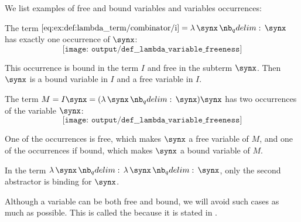 \begin{example}\label{ex:def:lambda_variable_freeness}
  We list examples of free and bound variables and variables occurrences:
  \begin{thmenum}
     The term \( \ref{eq:ex:def:lambda_term/combinator/i} = \qabs \synx \synx \) has exactly one occurrence of \( \synx \):
    \begin{equation*}
      \texttt{[image: output/def\_\_lambda\_variable\_freeness]}
    \end{equation*}

     This occurrence is bound in the term \( I \) and free in the subterm \( \synx \). Then \( \synx \) is a bound variable in \( I \) and a free variable in \( I \).

     The term \( M = I \synx = (\qabs \synx \synx) \synx \) has two occurrences of the variable \( \synx \):
    \begin{equation*}
      \texttt{[image: output/def\_\_lambda\_variable\_freeness]}
    \end{equation*}

    One of the occurrences is free, which makes \( \synx \) a free variable of \( M \), and one of the occurrences if bound, which makes \( \synx \) a bound variable of \( M \).

     In the term \( \qabs \synx \qabs \synx \synx \), only the second abstractor is binding for \( \synx \).
  \end{thmenum}
\end{example}

\begin{remark}\label{rem:barendregt_convention}
  Although a variable can be both free and bound, we will avoid such cases as much as possible. This is called the  because it is stated in .
\end{remark}

